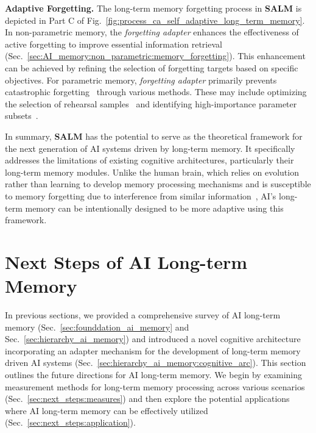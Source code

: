 \documentclass[journal,hideappendix]{vgtc}
\newenvironment{j_itemize}{
\begin{itemize}[]
  \setlength{\itemsep}{3pt}
  \setlength{\parskip}{0pt}
  \setlength{\parsep}{0pt}
}{\end{itemize}}
\begin{document}
\begin{j_itemize}
    \item[$\bullet$] \textbf{Adaptive Forgetting.} The long-term memory forgetting process in \textbf{SALM} is depicted in Part C of Fig.~\ref{fig:process_ca_self_adaptive_long_term_memory}. In non-parametric memory, the \textit{forgetting adapter} enhances the effectiveness of active forgetting to improve essential information retrieval (Sec.~\ref{sec:AI_memory:non_parametric:memory_forgetting}). This enhancement can be achieved by refining the selection of forgetting targets based on specific objectives. For parametric memory, \textit{forgetting adapter} primarily prevents catastrophic forgetting~\cite{aleixo2023catastrophic} through various methods. These may include optimizing the selection of rehearsal samples~\cite{lopez2017gradient,nguyen2018variational,de2019episodic,prabhu2020gdumb,roscow2021learning} and identifying high-importance parameter subsets~\cite{Adel2020Continual,xue2022meta}. 

\end{j_itemize}
  
  In summary, \textbf{SALM} has the potential to serve as the theoretical framework for the next generation of AI systems driven by long-term memory. It specifically addresses the limitations of existing cognitive architectures, particularly their long-term memory modules. Unlike the human brain, which relies on evolution rather than learning to develop memory processing mechanisms and is susceptible to memory forgetting due to interference from similar information~\cite{sweller2003evolution,manns2006evolution,allen2013evolution,shiffrin1969memory}, AI's long-term memory can be intentionally designed to be more adaptive using this framework.
  
\section{Next Steps of AI Long-term Memory}
\label{sec:next_steps}

In previous sections, we provided a comprehensive survey of AI long-term memory (Sec.~\ref{sec:founddation_ai_memory} and Sec.~\ref{sec:hierarchy_ai_memory}) and introduced a novel cognitive architecture incorporating an adapter mechanism for the development of long-term memory driven AI systems (Sec.~\ref{sec:hierarchy_ai_memory:cognitive_arc}). 
This section outlines the future directions for AI long-term memory. 
We begin by examining measurement methods for long-term memory processing across various scenarios (Sec.~\ref{sec:next_steps:measures}) and then explore the potential applications where AI long-term memory can be effectively utilized (Sec.~\ref{sec:next_steps:application}).
\end{document}
